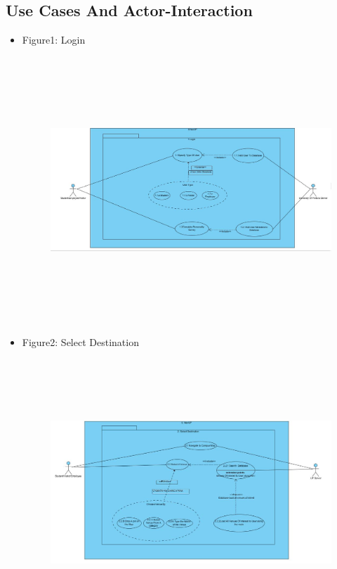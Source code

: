 \documentclass[12pt, a4paper]{article}
\begin{document}
		\subsection{Use Cases And Actor-Interaction}
	\begin{center}
	\begin{itemize}
		\item Figure1: Login
			\begin{figure}[H]\includegraphics[width = \textwidth, height = 10cm]{Login.JPG} \end{figure}
		\item Figure2: Select Destination
			\begin{figure}[H]\includegraphics[width = \textwidth, height = 10cm]{Select_Destination.JPG} \end{figure}

\end{itemize}
\end{center}
\end{document}
